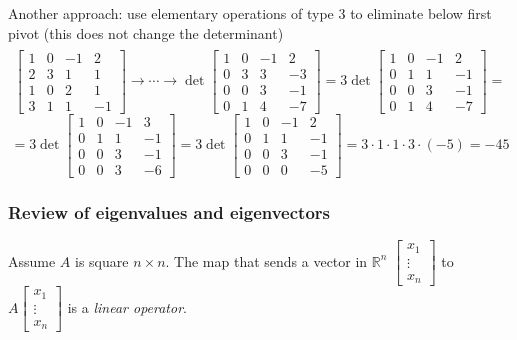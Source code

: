 \documentclass{article}
\newcommand{\tmem}[1]{{\em #1\/}}
\begin{document}
Another approach: use elementary operations of type 3 to eliminate below first
pivot (this does not change the determinant)
\begin{eqnarray*}
  &  & 
\end{eqnarray*}
\[ \left[\begin{array}{cccc}
     1 & 0 & - 1 & 2\\
     2 & 3 & 1 & 1\\
     1 & 0 & 2 & 1\\
     3 & 1 & 1 & - 1
   \end{array}\right] \rightarrow \cdots \rightarrow \det
   \left[\begin{array}{cccc}
     1 & 0 & - 1 & 2\\
     0 & 3 & 3 & - 3\\
     0 & 0 & 3 & - 1\\
     0 & 1 & 4 & - 7
   \end{array}\right] = 3 \det \left[\begin{array}{cccc}
     1 & 0 & - 1 & 2\\
     0 & 1 & 1 & - 1\\
     0 & 0 & 3 & - 1\\
     0 & 1 & 4 & - 7
   \end{array}\right] = \]
\[ = 3 \det \left[\begin{array}{cccc}
     1 & 0 & - 1 & 3\\
     0 & 1 & 1 & - 1\\
     0 & 0 & 3 & - 1\\
     0 & 0 & 3 & - 6
   \end{array}\right] = 3 \det \left[\begin{array}{cccc}
     1 & 0 & - 1 & 2\\
     0 & 1 & 1 & - 1\\
     0 & 0 & 3 & - 1\\
     0 & 0 & 0 & - 5
   \end{array}\right] = 3 \cdot 1 \cdot 1 \cdot 3 \cdot (- 5) = - 45 \]
\subsubsection{Review of eigenvalues and eigenvectors}

Assume $A$ is square $n \times n$. The map that sends a vector in
$\mathbb{R}^n$ $\left[\begin{array}{c}
  x_1\\
  \vdots\\
  x_n
\end{array}\right] $ to $A \left[\begin{array}{c}
  x_1\\
  \vdots\\
  x_n
\end{array}\right]$ is a {\tmem{linear operator}}.
\end{document}
